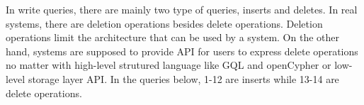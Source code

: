 In write queries, there are mainly two type of queries, inserts and deletes.
In real systems, there are deletion operations besides delete operations.
Deletion operations limit the architecture that can be used by a system. On
the other hand, systems are supposed to provide API for users to express
delete operations no matter with high-level strutured language like GQL and
openCypher or low-level storage layer API. In the queries below, 1-12 are
inserts while 13-14 are delete operations.














